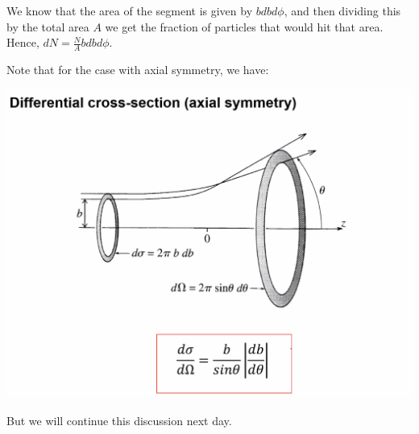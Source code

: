 \begin{s}
We know that the area of the segment is given by $b dbd\phi$, and then dividing this by the total area $A$ we get the fraction of particles that would hit that area. Hence, $dN = \frac{N}{A}bdbd\phi$.
\end{s}
Note that for the case with axial symmetry, we have:
\begin{center}
    \includegraphics[scale=0.7]{Lecture-27/l27-img10.png}
\end{center}
But we will continue this discussion next day.